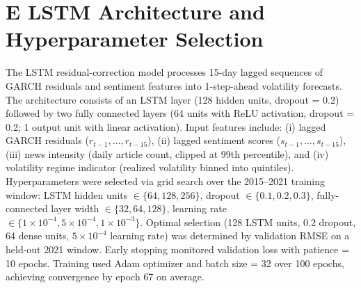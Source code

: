 \section*{E \quad LSTM Architecture and Hyperparameter Selection}

The LSTM residual-correction model processes 15-day lagged sequences of GARCH residuals and sentiment features into 1-step-ahead volatility forecasts. The architecture consists of an LSTM layer (128 hidden units, dropout = 0.2) followed by two fully connected layers (64 units with ReLU activation, dropout = 0.2; 1 output unit with linear activation). Input features include: (i) lagged GARCH residuals ($r_{t-1}, \ldots, r_{t-15}$), (ii) lagged sentiment scores ($s_{t-1}, \ldots, s_{t-15}$), (iii) news intensity (daily article count, clipped at 99th percentile), and (iv) volatility regime indicator (realized volatility binned into quintiles). Hyperparameters were selected via grid search over the 2015--2021 training window: LSTM hidden units $\in \{64, 128, 256\}$, dropout $\in \{0.1, 0.2, 0.3\}$, fully-connected layer width $\in \{32, 64, 128\}$, learning rate $\in \{1 \times 10^{-4}, 5 \times 10^{-4}, 1 \times 10^{-3}\}$. Optimal selection (128 LSTM units, 0.2 dropout, 64 dense units, $5 \times 10^{-4}$ learning rate) was determined by validation RMSE on a held-out 2021 window. Early stopping monitored validation loss with patience = 10 epochs. Training used Adam optimizer and batch size = 32 over 100 epochs, achieving convergence by epoch 67 on average.

